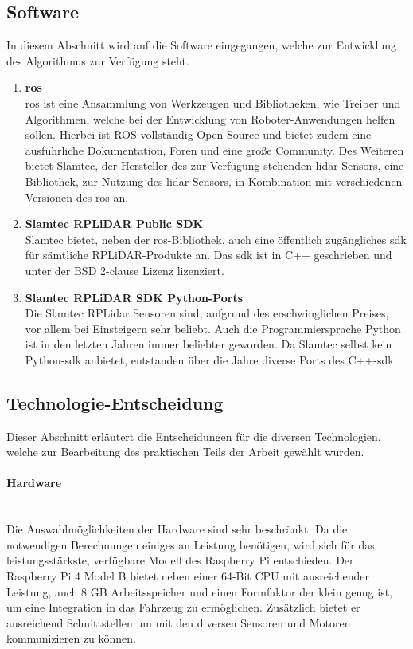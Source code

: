 \subsection{Software}
In diesem Abschnitt wird auf die Software eingegangen, welche zur Entwicklung des Algorithmus zur Verfügung steht.

\begin{enumerate}[leftmargin=*]
    \item \textbf{\acf{ros}} \\
    \ac{ros} ist eine Ansammlung von Werkzeugen und Bibliotheken, wie Treiber und Algorithmen, welche bei der Entwicklung von Roboter-Anwendungen helfen sollen. 
    Hierbei ist ROS vollständig Open-Source und bietet zudem eine ausführliche Dokumentation, Foren und eine große Community. \cite{Ros2024}
    Des Weiteren bietet Slamtec, der Hersteller des zur Verfügung stehenden \ac{lidar}-Sensors, eine Bibliothek, zur Nutzung des \ac{lidar}-Sensors, in Kombination mit verschiedenen Versionen des \ac{ros} an. \cite{RplidarRos2023}

    \item \textbf{Slamtec RPLiDAR Public SDK} \\
    Slamtec bietet, neben der \ac{ros}-Bibliothek, auch eine öffentlich zugängliches \ac{sdk} für sämtliche RPLiDAR-Produkte an. 
    Das \ac{sdk} ist in C++ geschrieben und unter der BSD 2-clause Lizenz lizenziert. \cite{RplidarSDK2023}

    \item \textbf{Slamtec RPLiDAR SDK Python-Ports} \\
    Die Slamtec RPLidar Sensoren sind, aufgrund des erschwinglichen Preises, vor allem bei Einsteigern sehr beliebt.
    Auch die Programmiersprache Python ist in den letzten Jahren immer beliebter geworden.
    Da Slamtec selbst kein Python-\ac{sdk} anbietet, entstanden über die Jahre diverse Ports des C++-\ac{sdk}.
\end{enumerate}

\subsection{Technologie-Entscheidung}
Dieser Abschnitt erläutert die Entscheidungen für die diversen Technologien, welche zur Bearbeitung des praktischen Teils der Arbeit gewählt wurden.

\paragraph{Hardware} \mbox{}\\
Die Auswahlmöglichkeiten der Hardware sind sehr beschränkt.
Da die not\-wendigen Berechnungen einiges an Leistung benötigen, wird sich für das leistungsstärkste, verfügbare Modell des Raspberry Pi entschieden.
Der Raspberry Pi 4 Model B bietet neben einer 64-Bit CPU mit ausreichender Leistung, auch 8 GB Arbeitsspeicher und einen Formfaktor der klein genug ist, um eine Integration in das Fahrzeug zu ermöglichen.
Zusätzlich bietet er ausreichend Schnittstellen um mit den diversen Sensoren und Motoren kommunizieren zu können.

